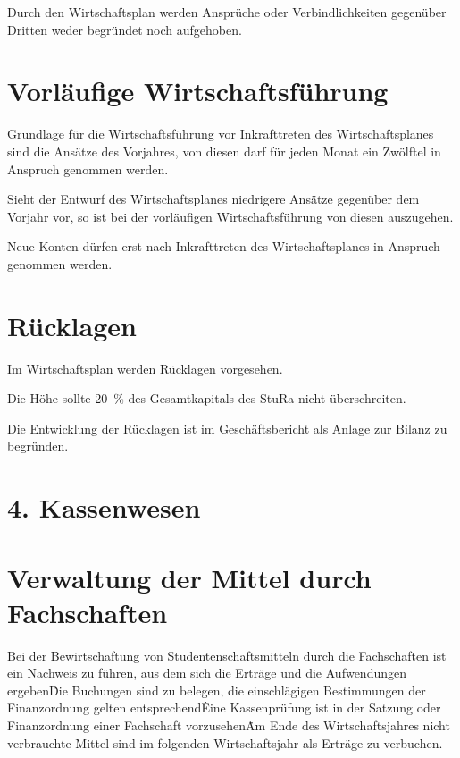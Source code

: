 \begin{multicols}{2}
\Abs \Satz Durch den Wirtschaftsplan werden Ansprüche oder Verbindlichkeiten gegenüber Dritten weder begründet noch aufgehoben.



\section{Vorläufige Wirtschaftsführung}

\Abs \Satz Grundlage für die Wirtschaftsführung vor Inkrafttreten des Wirtschaftsplanes sind die Ansätze des Vorjahres, von diesen darf für jeden Monat ein Zwölftel in Anspruch genommen werden.

\Abs \Satz Sieht der Entwurf des Wirtschaftsplanes niedrigere Ansätze gegenüber dem Vorjahr vor, so ist bei der vorläufigen Wirtschaftsführung von diesen auszugehen.

\Abs \Satz Neue Konten dürfen erst nach Inkrafttreten des Wirtschaftsplanes in Anspruch genommen werden.



\section{Rücklagen}

\Abs \Satz Im Wirtschaftsplan werden Rücklagen vorgesehen.

\Abs \Satz Die Höhe sollte 20~\% des Gesamtkapitals des StuRa nicht überschreiten.

\Abs \Satz Die Entwicklung der Rücklagen ist im Geschäftsbericht als Anlage zur Bilanz zu begründen.


\section*{4. Kassenwesen}



\section{Verwaltung der Mittel durch Fachschaften}

\Abs \Satz Bei der Bewirtschaftung von Studentenschaftsmitteln durch die Fachschaften ist ein Nachweis zu führen, aus dem sich die Erträge und die Aufwendungen ergeben\. Die Buchungen sind zu belegen, die einschlägigen Bestimmungen der Finanzordnung gelten entsprechend\. Eine Kassenprüfung ist in der Satzung oder Finanzordnung einer Fachschaft vorzusehen\. Am Ende des Wirtschaftsjahres nicht verbrauchte Mittel sind im folgenden Wirtschaftsjahr als Erträge zu verbuchen.


\end{multicols}
